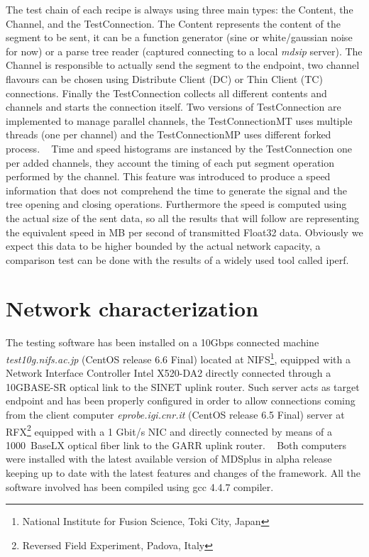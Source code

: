 \documentclass[10pt,a4paper]{article}
\begin{document}
The test chain of each recipe is always using three main types: the Content, the Channel, and the TestConnection. 
The Content represents the content of the segment to be sent, it can be a function generator (sine or white/gaussian noise for now) or a parse tree reader (captured connecting to a local \emph{mdsip} server). 
The Channel is responsible to actually send the segment to the endpoint, two channel flavours can be chosen using Distribute Client (DC) or Thin Client (TC) connections. Finally the TestConnection collects all different contents and channels and starts the connection itself. Two versions of TestConnection are implemented to manage parallel channels, the TestConnectionMT uses multiple threads (one per channel) and the TestConnectionMP uses different forked process.
~
Time and speed histograms are instanced by the TestConnection one per added channels, they account the timing of each put segment operation performed by the channel. This feature was introduced to produce a speed information that does not comprehend the time to generate the signal and the tree opening and closing operations. 
Furthermore the speed is computed using the actual size of the sent data, so all the results that will follow are representing the equivalent speed in MB per second of transmitted Float32 data. 
Obviously we expect this data to be higher bounded by the actual network capacity, a comparison test can be done with the results of a widely used tool called iperf.

\section{Network characterization}

The testing software has been installed on a 10Gbps connected machine \emph{test10g.nifs.ac.jp} (CentOS release 6.6 Final) located at NIFS\footnote{National Institute for Fusion Science, Toki City, Japan}, equipped with a Network Interface Controller Intel X520-DA2 directly connected through a 10GBASE-SR optical link to the SINET uplink router.
Such server acts as target endpoint and has been properly configured in order to allow connections coming from the client computer \emph{eprobe.igi.cnr.it} (CentOS release 6.5 Final) server at RFX\footnote{Reversed Field Experiment, Padova, Italy} equipped with a 1 Gbit/s NIC and directly connected by means of a 1000~BaseLX optical fiber link to the GARR uplink router.
~
Both computers were installed with the latest available version of MDSplus in alpha release keeping up to date with the latest features and changes of the framework.
All the software involved has been compiled using gcc 4.4.7 compiler.
\end{document}
